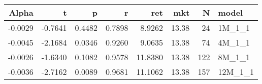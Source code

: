 \begin{table}[ht]
\centering
\begin{tabular}{rrrrrrrl}
  \hline
Alpha & t & p & r & ret & mkt & N & model \\ 
  \hline
-0.0029 & -0.7641 & 0.4482 & 0.7898 & 8.9262 & 13.38 & 24 & 1M\_1\_1 \\ 
  -0.0045 & -2.1684 & 0.0346 & 0.9260 & 9.0635 & 13.38 & 74 & 4M\_1\_1 \\ 
  -0.0026 & -1.6340 & 0.1082 & 0.9578 & 11.8380 & 13.38 & 122 & 8M\_1\_1 \\ 
  -0.0036 & -2.7162 & 0.0089 & 0.9681 & 11.1062 & 13.38 & 157 & 12M\_1\_1 \\ 
   \hline
\end{tabular}
\end{table}

